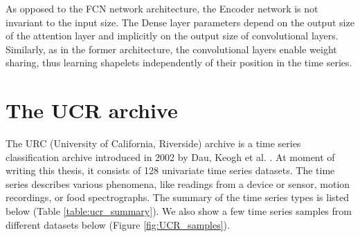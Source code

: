 \documentclass[a4paper,11pt,twoside]{report}
\theoremstyle{definition}
\begin{document}
As opposed to the FCN network architecture, the Encoder network is not invariant to the input size. The Dense layer parameters depend on the output size of the attention layer and implicitly on the output size of convolutional layers.  Similarly, as in the former architecture, the convolutional layers enable weight sharing, thus learning shapelets independently of their position in the time series.


\section{The UCR archive}
The URC (University of California, Riverside) archive is a time series classification archive introduced in 2002 by Dau, Keogh et al. \cite{UCR_archive}. At moment of writing this thesis, it consists of 128 univariate time series datasets. The time series describes various phenomena, like readings from a device or sensor, motion recordings, or food spectrographs. The summary of the time series types is listed below (Table \ref{table:ucr_summary}). We also show a few time series samples from different datasets below (Figure \ref{fig:UCR_samples}).
\begin{table}[!h]
\centering
\tabcolsep=0.11cm
\caption{Summary of types of datasets in the UCR archive.}
\label{table:ucr_summary}
\end{table}
\FloatBarrier
\end{document}
